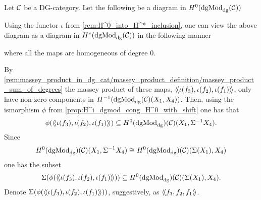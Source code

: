\begin{remark}
    \label{rem:massey_in_H^0(dgMod_dg)}
    Let \( {\mathcal{C}} \) be a DG-category. Let the following be a diagram in \( H^0(\operatorname{dgMod}_{\operatorname{dg}}({\mathcal{C}})) \)
    \begin{center}
    \end{center}
    Using the functor \( \iota \) from \autoref{rem:H^0_into_H^*_inclusion}, one can view the above diagram as a diagram in \( H^*(\operatorname{dgMod}_{\operatorname{dg}}({\mathcal{C}})) \) in the following manner
    \begin{center}
    \end{center}
    where all the maps are homogeneous of degree \( 0 \).

    By \autoref{rem:massey_product_in_dg_cat/massey_product_definition/massey_product_sum_of_degrees} the massey product of these maps, \( \langle \! \langle\iota(f_3), \iota(f_2), \iota(f_1)\rangle \! \rangle \), only have non-zero components in \( H^{-1}(\operatorname{dgMod}_{\operatorname{dg}}({\mathcal{C}})(X_1, X_4)) \). Then, using the ismorphism \( \phi \) from \autoref{prop:H^i_dgmod_cong_H^0_with_shift} one has that
    \[
        \phi(\langle \! \langle\iota(f_3), \iota(f_2), \iota(f_1)\rangle \! \rangle) \subseteq H^0(\operatorname{dgMod}_{\operatorname{dg}})({\mathcal{C}})(X_1, \Sigma^{-1}X_4).
    \]
    Since
    \[
        H^0(\operatorname{dgMod}_{\operatorname{dg}})({\mathcal{C}})(X_1, \Sigma^{-1}X_4) \cong H^0(\operatorname{dgMod}_{\operatorname{dg}})({\mathcal{C}})(\Sigma(X_1), X_4)
    \]
    one has the subset
    \[
        \Sigma(\phi(\langle \! \langle\iota(f_3), \iota(f_2), \iota(f_1)\rangle \! \rangle)) \subseteq H^0(\operatorname{dgMod}_{\operatorname{dg}})({\mathcal{C}})(\Sigma(X_1), X_4).
    \]
    Denote \( \Sigma(\phi(\langle \! \langle\iota(f_3), \iota(f_2), \iota(f_1)\rangle \! \rangle)) \), suggestively, as \( \langle \! \langle f_3, f_2, f_1\rangle \! \rangle \).
\end{remark}

